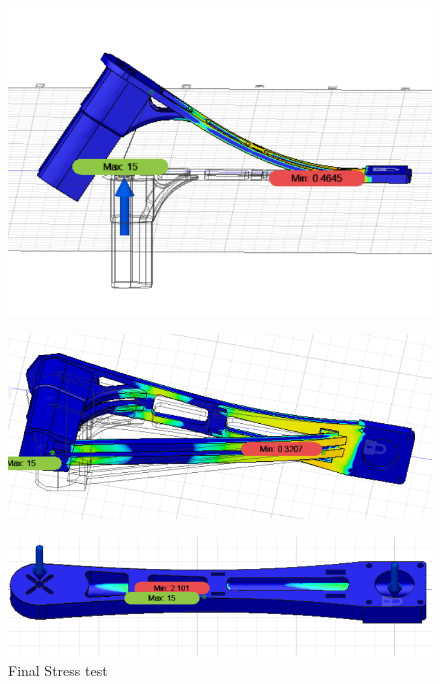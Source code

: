\documentclass{hitec}
\begin{document}
\begin{figure}[h]
	\centering
	\begin{minipage}{.5\textwidth}
		\centering
		\includegraphics[width=.9\linewidth]{rev1stress}
		\label{fig:r1s}
	\end{minipage}%
	\begin{minipage}{.5\textwidth}
		\centering
		\includegraphics[width=.9\linewidth]{rev2stress}
		\label{fig:r2s}
	\end{minipage}
\end{figure}
	\begin{figure}[h]
	\centering
	\includegraphics[width=\linewidth]{rev3stress}
	\caption{Final Stress test}
	\label{fig:r3s}
	\end{figure}
\end{document}
